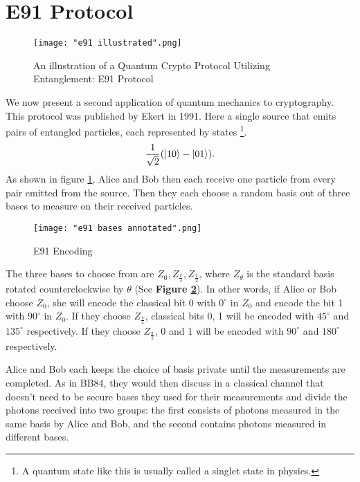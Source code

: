 \section{E91 Protocol} \label{section: e91}
\begin{figure}[h]
    \centering
    \texttt{[image: "e91 illustrated".png]}
    \caption{An illustration of a Quantum Crypto Protocol Utilizing Entanglement: E91 Protocol \protect\footnotemark}
    \label{fig:E91 Illustrated}
\end{figure}


We now present a second application of quantum mechanics to cryptography.  This protocol was published by Ekert in 1991\cite{Ekert1991}.  Here a single source that emits pairs of entangled particles, each represented by states \footnote{A quantum state like this is usually called a singlet state in physics.}.
$$\frac{1}{\sqrt{2}}(\ket{10}-\ket{01}).$$
As shown in figure \ref{fig:E91 Illustrated}, Alice and Bob then each receive one particle from every pair emitted from the source. Then they each choose a random basis out of three bases to measure on their received particles. 

\begin{figure}[h]
    \centering
    \texttt{[image: "e91 bases annotated".png]}
    \caption{E91 Encoding}
    \label{fig:e91 encoding}
\end{figure}

The three bases to choose from are $Z_0, Z_{\frac{\pi}{4}}, Z_{\frac{\pi}{2}}$, where $Z_\theta$ is the standard basis rotated counterclockwise by $\theta$ (See \textbf{Figure \ref{fig:e91 encoding}}). In other words, if Alice or Bob choose $Z_0$, she will encode the classical bit 0 with  $0^\circ$ in $Z_0$ and encode the bit 1 with $90^\circ$ in $Z_0$. If they choose $Z_{\frac{\pi}{4}}$, classical bits 0, 1 will be encoded with $45^\circ$ and $135^\circ$ respectively. If they choose $Z_{\frac{\pi}{2}}$, 0 and 1 will be encoded with $90^\circ$ and $180^\circ$ respectively.

Alice and Bob each keeps the choice of basis private until the measurements are completed. As in BB84, they would then discuss in a classical channel that doesn't need to be secure bases they used for their measurements and divide the photons received into two groups: the first consists of photons measured in the same basis by Alice and Bob, and the second contains photons measured in different bases. 

